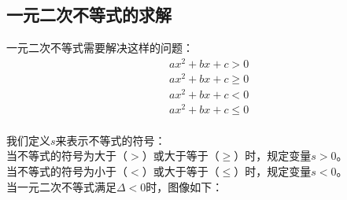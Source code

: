 \documentclass[UTF8]{ctexart}
\begin{document}
\newpage

\subsection{一元二次不等式的求解}
    一元二次不等式需要解决这样的问题：
    \setcounter{equation}{0}
    \begin{align}
        &ax^2+bx+c>0\\[3mm]
        &ax^2+bx+c\geq 0\\[3mm]
        &ax^2+bx+c<0\\[3mm]
        &ax^2+bx+c\leq 0
    \end{align}\\
    我们定义$s$来表示不等式的符号：\\[3mm]
    当不等式的符号为大于（$>$）或大于等于（$\geq$）时，规定变量$s>0$。\\[3mm]
    当不等式的符号为小于（$<$）或大于等于（$\leq$）时，规定变量$s<0$。\\[10mm]
    当一元二次不等式满足$\Delta<0$时，图像如下：
\end{document}
